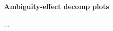 \documentclass[../main.tex]{subfiles}
\begin{document}



\paragraph{Ambiguity-effect decomp plots} ...
\end{document}
